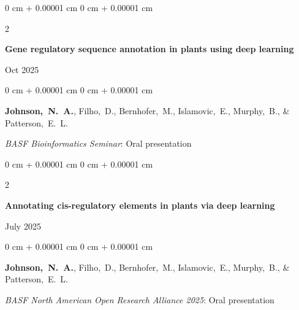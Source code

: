 \documentclass[10pt, letterpaper]{article}
\newenvironment{onecolentry}{
    \begin{adjustwidth}{
        0 cm + 0.00001 cm
    }{
        0 cm + 0.00001 cm
    }
}{
    \end{adjustwidth}
} %
\newenvironment{twocolentry}[2][]{
    \onecolentry
    \def\secondColumn{#2}
    \setcolumnwidth{\fill, 4.5 cm}
    \begin{paracol}{2}
}{
    \switchcolumn \raggedleft \secondColumn
    \end{paracol}
    \endonecolentry
} %
\begin{document}
        \vspace{0.2 cm}


        \begin{samepage}
            \begin{twocolentry}{
                Oct 2025
                }
                \textbf{Gene regulatory sequence annotation in plants using deep learning}
            \end{twocolentry}

            \vspace{0.10 cm}
            
            \begin{onecolentry}
                \mbox{\textbf{Johnson, N. A.}}, \mbox{Filho, D.}, \mbox{Bernhofer, M.}, \mbox{Islamovic, E.}, \mbox{Murphy, B.}, \& \mbox{Patterson, E. L.}

                \vspace{0.10 cm}
                
                \textit{BASF Bioinformatics Seminar}: Oral presentation
            \end{onecolentry}
        \end{samepage}


        \vspace{0.2 cm}


        \begin{samepage}
            \begin{twocolentry}{
                July 2025
                }
                \textbf{Annotating cis-regulatory elements in plants via deep learning}
            \end{twocolentry}

            \vspace{0.10 cm}
            
            \begin{onecolentry}
                \mbox{\textbf{Johnson, N. A.}}, \mbox{Filho, D.}, \mbox{Bernhofer, M.}, \mbox{Islamovic, E.}, \mbox{Murphy, B.}, \& \mbox{Patterson, E. L.}

                \vspace{0.10 cm}
                
                \textit{BASF North American Open Research Alliance 2025}: Oral presentation
            \end{onecolentry}
        \end{samepage}


        \vspace{0.2 cm}
\end{document}
